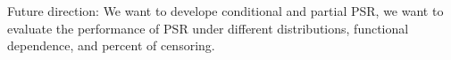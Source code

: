 \documentclass[]{article}
\begin{document}
Future direction: We want to develope conditional and partial PSR, we want to evaluate the performance of PSR under different distributions, functional dependence, and percent of censoring.
	

%
%
\end{document}
